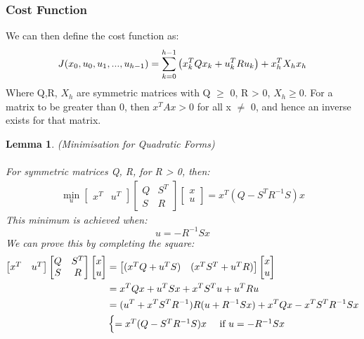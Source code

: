 \documentclass{article}
\newtheorem{lemma}[theorem]{Lemma}
\begin{document}
\subsubsection*{Cost Function}
We can then define the cost function as:
\[
\centering
J(x_0,u_0,u_1,...,u_{h-1}) = \sum_{k=0}^{h-1} \left( x_k^T Q x_k + u_k^T R u_k \right) + x_h^T X_h x_h 
\]
Where Q,R, $X_h$ are symmetric matrices with Q $\geq$ 0, R > 0, $X_h \geq 0$. For a matrix to be greater than 0, then $x^T A x > 0$ for all x $\neq$ 0, and hence an inverse exists for that matrix.
\begin{lemma}{(Minimisation for Quadratic Forms)}\label{lma1}
\\ \\ 
For symmetric matrices Q, R, for R > 0, then:
\[
\begin{aligned}
\min_u \begin{bmatrix}
x^T & u^T
\end{bmatrix}
\begin{bmatrix}
Q & S^T \\ S & R
\end{bmatrix}
\begin{bmatrix}
x \\ u
\end{bmatrix}
= x^T(Q - S^T R^{-1} S) x 
\end{aligned}
\]
This minimum is achieved when:
\[
u = -R^{-1}Sx
\]
We can prove this by completing the square:
\[
\begin{aligned}
\begin{bmatrix}
x^T & u^T
\end{bmatrix}
\begin{bmatrix}
Q & S^T \\ S & R
\end{bmatrix}
\begin{bmatrix}
x \\ u
\end{bmatrix}
&= \begin{bmatrix}
(x^T Q + u^T S) & (x^T S^T + u^T R) 
\end{bmatrix}
\begin{bmatrix}
    x \\ u
\end{bmatrix}
\\ 
&= x^T Q x + u^T S x + x^T S^T u + u^T R u \\ 
&= (u^T + x^T S^T R^{-1})R(u + R^{-1}Sx) + x^T Q x - x^T S^T R^{-1}Sx \\
&\begin{cases}
= x^T(Q - S^T R^{-1}S)x & \text{ \normalfont if } u= -R^{-1}Sx \\

\end{cases}
\end{aligned}\]
\end{lemma}
\end{document}
